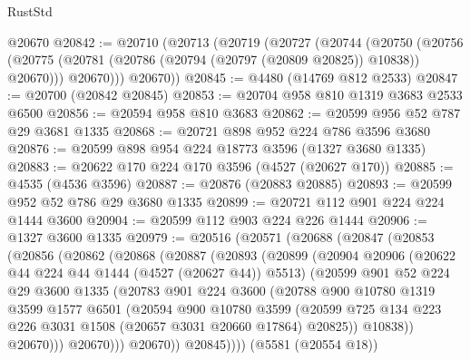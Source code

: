 \begin{lexlean}{RustStd}
\begin{coremodule}
{\begin{coremodule}
{{{{{{{{{{{{{{{{{{{{{{{{{{{{{{{{{{{{{{    @20670
@20842 := @20710
    (@20713
      (@20719
        (@20727
          (@20744
            (@20750
              (@20756 (@20775 (@20781 (@20786 (@20794 (@20797 (@20809 @20825)) @10838)) @20670)))
              @20670)))
        @20670))
@20845 := @4480 (@14769 @812 @2533)
@20847 := @20700 (@20842 @20845)
@20853 := @20704 @958 @810 @1319 @3683 @2533 @6500
@20856 := @20594 @958 @810 @3683
@20862 := @20599 @956 @52 @787 @29 @3681 @1335
@20868 := @20721 @898 @952 @224 @786 @3596 @3680
@20876 := @20599 @898 @954 @224 @18773 @3596 (@1327 @3680 @1335)
@20883 := @20622 @170 @224 @170 @3596 (@4527 (@20627 @170))
@20885 := @4535 (@4536 @3596)
@20887 := @20876 (@20883 @20885)
@20893 := @20599 @952 @52 @786 @29 @3680 @1335
@20899 := @20721 @112 @901 @224 @224 @1444 @3600
@20904 := @20599 @112 @903 @224 @226 @1444
@20906 := @1327 @3600 @1335
@20979 := @20516
    (@20571
      (@20688
        (@20847
          (@20853
            (@20856
              (@20862
                (@20868
                  (@20887
                    (@20893
                      (@20899
                        (@20904
                          @20906
                          (@20622 @44 @224 @44 @1444 (@4527 (@20627 @44)) @5513)
                          (@20599
                            @901
                            @52
                            @224
                            @29
                            @3600
                            @1335
                            (@20783
                              @901
                              @224
                              @3600
                              (@20788
                                @900
                                @10780
                                @1319
                                @3599
                                @1577
                                @6501
                                (@20594
                                  @900
                                  @10780
                                  @3599
                                  (@20599
                                    @725
                                    @134
                                    @223
                                    @226
                                    @3031
                                    @1508
                                    (@20657 @3031 @20660 @17864)
                                    @20825))
                                @10838))
                            @20670)))
                      @20670)))
                @20670))
            @20845))))
    (@5581 (@20554 @18))
}}}}}}}}}}}}}}}}}}}}}}}}}}}}}}}}}}}}}}
\end{coremodule}}
\end{coremodule}
\end{lexlean}
